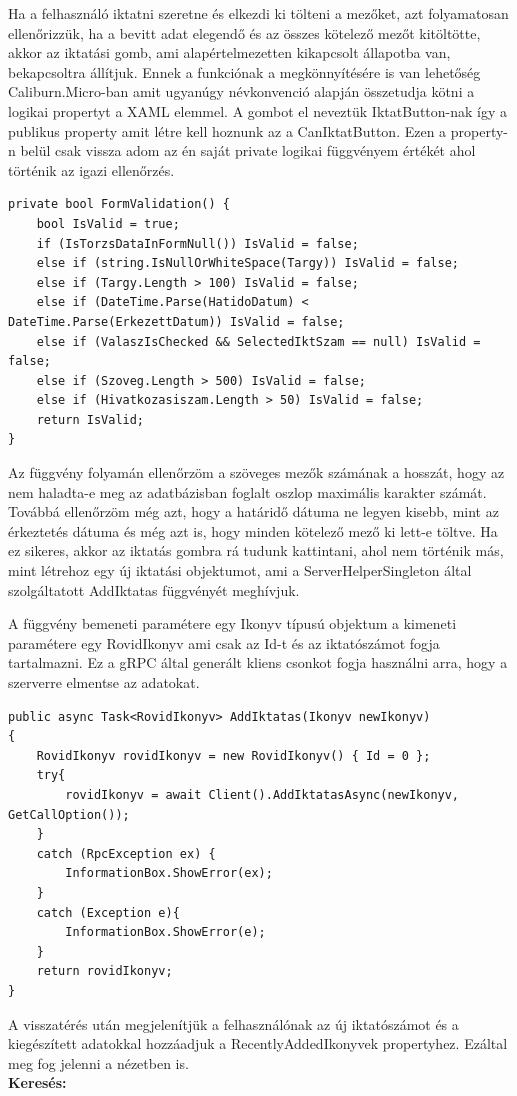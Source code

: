 \documentclass[
]{thesis-ekf}
\theoremstyle{definition}
\theoremstyle{remark}
\begin{document}
Ha a felhasználó iktatni szeretne és elkezdi ki tölteni a mezőket, azt folyamatosan ellenőrizzük, ha a bevitt adat elegendő és az összes kötelező mezőt kitöltötte, akkor az iktatási gomb, ami alapértelmezetten kikapcsolt állapotba van, bekapcsoltra állítjuk. Ennek a funkciónak a megkönnyítésére is van lehetőség Caliburn.Micro-ban amit ugyanúgy névkonvenció alapján összetudja kötni a logikai propertyt a XAML elemmel. A gombot el neveztük IktatButton-nak így a publikus property amit létre kell hoznunk az a CanIktatButton.
Ezen a property-n belül csak vissza adom az én saját private logikai függvényem értékét ahol történik az igazi ellenőrzés. 
\begin{lstlisting}[caption={Iktatáshoz tartozó adatok validálása.},captionpos=b]
private bool FormValidation() {
	bool IsValid = true;
	if (IsTorzsDataInFormNull()) IsValid = false;
	else if (string.IsNullOrWhiteSpace(Targy)) IsValid = false;
	else if (Targy.Length > 100) IsValid = false;
	else if (DateTime.Parse(HatidoDatum) < DateTime.Parse(ErkezettDatum)) IsValid = false;
	else if (ValaszIsChecked && SelectedIktSzam == null) IsValid = false;
	else if (Szoveg.Length > 500) IsValid = false;
	else if (Hivatkozasiszam.Length > 50) IsValid = false;
	return IsValid;
}
\end{lstlisting}
Az függvény folyamán ellenőrzöm a szöveges mezők számának a hosszát, hogy az nem haladta-e meg az adatbázisban foglalt oszlop maximális karakter számát. Továbbá ellenőrzöm még azt, hogy a határidő dátuma ne legyen kisebb, mint az érkeztetés dátuma és még azt is, hogy minden kötelező mező ki lett-e töltve. Ha ez sikeres, akkor az iktatás gombra rá tudunk kattintani, ahol nem történik más, mint létrehoz egy új iktatási objektumot, ami a ServerHelperSingleton által szolgáltatott AddIktatas függvényét meghívjuk. 

A függvény bemeneti paramétere egy Ikonyv típusú objektum a kimeneti paramétere egy RovidIkonyv ami csak az Id-t és az iktatószámot fogja tartalmazni. Ez a gRPC által generált kliens csonkot fogja használni arra, hogy a szerverre elmentse az adatokat. 
\begin{lstlisting}[caption={Iktatás hozzzáadása.},captionpos=b]
public async Task<RovidIkonyv> AddIktatas(Ikonyv newIkonyv)
{
	RovidIkonyv rovidIkonyv = new RovidIkonyv() { Id = 0 };
	try{
		rovidIkonyv = await Client().AddIktatasAsync(newIkonyv, GetCallOption());
	}
	catch (RpcException ex)	{
		InformationBox.ShowError(ex);
	}
	catch (Exception e){
		InformationBox.ShowError(e);
	}
	return rovidIkonyv;
}

\end{lstlisting}
A visszatérés után megjelenítjük a felhasználónak az új iktatószámot és a kiegészített adatokkal hozzáadjuk a RecentlyAddedIkonyvek propertyhez. Ezáltal meg fog jelenni a nézetben is.\\
\textbf{Keresés:}
\end{document}
